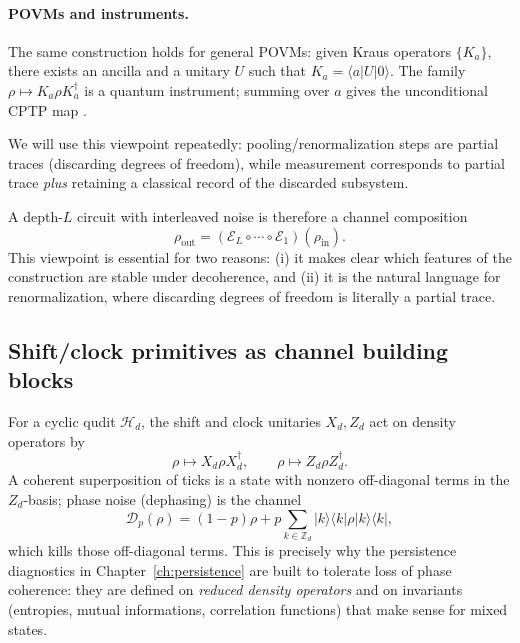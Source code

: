 \documentclass[11pt,oneside]{amsbook}
\numberwithin{equation}{section}
\theoremstyle{plain}
\theoremstyle{definition}
\theoremstyle{remark}
\newcommand{\ket}[1]{\lvert #1 \rangle}
\newcommand{\bra}[1]{\langle #1 \rvert}
\begin{document}
\paragraph{POVMs and instruments.}
The same construction holds for general POVMs: given Kraus operators $\{K_a\}$, there exists an ancilla and a unitary $U$ such that $K_a=\langle a|U|0\rangle$.
The family $\rho\mapsto K_a\rho K_a^\dagger$ is a quantum instrument; summing over $a$ gives the unconditional CPTP map \cite{WisemanMilburn2009QuantumMeasurement}.

We will use this viewpoint repeatedly: pooling/renormalization steps are partial traces (discarding degrees of freedom), while measurement corresponds to partial trace \emph{plus} retaining a classical record of the discarded subsystem.


A depth-$L$ circuit with interleaved noise is therefore a channel composition
\[
\rho_{\mathrm{out}} = (\mathcal{E}_L\circ\cdots\circ\mathcal{E}_1)(\rho_{\mathrm{in}}).
\]
This viewpoint is essential for two reasons:
(i) it makes clear which features of the construction are stable under decoherence, and
(ii) it is the natural language for renormalization, where discarding degrees of freedom is literally a partial trace.

\subsection{Shift/clock primitives as channel building blocks}
For a cyclic qudit $\mathcal{H}_d$, the shift and clock unitaries $X_d,Z_d$ act on density operators by
\[
\rho\mapsto X_d\rho X_d^\dagger,\qquad \rho\mapsto Z_d\rho Z_d^\dagger.
\]
A coherent superposition of ticks is a state with nonzero off-diagonal terms in the $Z_d$-basis; phase noise (dephasing) is the channel
\[
\mathcal{D}_p(\rho)=(1-p)\rho + p\sum_{k\in\mathbb{Z}_d}\ket{k}\bra{k}\rho\ket{k}\bra{k},
\]
which kills those off-diagonal terms.
This is precisely why the persistence diagnostics in Chapter~\ref{ch:persistence} are built to tolerate loss of phase coherence: they are defined on \emph{reduced density operators} and on invariants (entropies, mutual informations, correlation functions) that make sense for mixed states.
\end{document}
